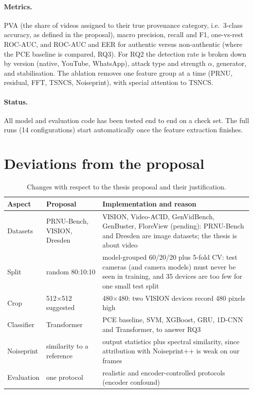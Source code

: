 \documentclass[11pt,a4paper]{article}
\begin{document}
\paragraph{Metrics.} PVA (the share of videos assigned to their true provenance category, i.e.\
3-class accuracy, as defined in the proposal), macro precision, recall and F1, one-vs-rest ROC-AUC,
and ROC-AUC and EER for authentic versus non-authentic (where the PCE baseline is compared, RQ3).
For RQ2 the detection rate is broken down by version (native, YouTube, WhatsApp), attack type and
strength $\alpha$, generator, and stabilisation. The ablation removes one feature group at a time
(PRNU, residual, FFT, TSNCS, Noiseprint), with special attention to TSNCS.

\paragraph{Status.} All model and evaluation code has been tested end to end on a check set. The full
runs (14 configurations) start automatically once the feature extraction finishes.

\section{Deviations from the proposal}

\begin{table}[H]
\centering\small
\caption{Changes with respect to the thesis proposal and their justification.}
\begin{tabularx}{\linewidth}{lYY}
\toprule
Aspect & Proposal & Implementation and reason \\
\midrule
Datasets & PRNU-Bench, VISION, Dresden & VISION, Video-ACID, GenVidBench, GenBuster, FloreView (pending):
  PRNU-Bench and Dresden are image datasets; the thesis is about video \\
Split & random 80:10:10 & model-grouped 60/20/20 plus 5-fold CV: test cameras (and camera models)
  must never be seen in training, and 35 devices are too few for one small test split \\
Crop & 512$\times$512 suggested & 480$\times$480: two VISION devices record 480 pixels high \\
Classifier & Transformer & PCE baseline, SVM, XGBoost, GRU, 1D-CNN and Transformer, to answer RQ3 \\
Noiseprint & similarity to a reference & output statistics plus spectral similarity, since attribution
  with Noiseprint++ is weak on our frames \\
Evaluation & one protocol & realistic and encoder-controlled protocols (encoder confound) \\
\bottomrule
\end{tabularx}
\end{table}
\end{document}
